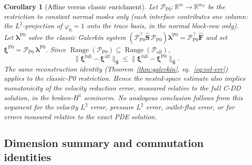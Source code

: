 \documentclass[11pt,a4paper]{article}
\newtheorem{corollary}[assumption]{Corollary}
\newcommand{\R}{\mathbb{R}}
\newcommand{\trac}{\bm{\lambda}}
\newcommand{\Schur}{\mathbf{S}}
\newcommand{\Range}{\operatorname{Range}}
\begin{document}
\begin{corollary}[Affine versus classic enrichment]\label{cor:enrich}
  Let $\mathcal{P}_{\text{P0}} : \R^m \to \R^{m_\Gamma}$ be the restriction
  to constant normal modes only (each interface contributes one column:
  the $L^2$-projection of $\varphi_0=1$ onto the trace basis, in the
  normal block-row only).
  Let $\trac^{\text{P0}}$ solve the classic Galerkin system
  $(\mathcal{P}_{\text{P0}}^\top \widehat{\Schur}\,\mathcal{P}_{\text{P0}})
   \trac^{\text{P0}} = \mathcal{P}_{\text{P0}}^\top \widehat{\bm{F}}$
  and set $\bm{\xi}^{\text{P0}} = \mathcal{P}_{\text{P0}}\,
  \trac^{\text{P0}}$.
  Since
  $\Range(\mathcal{P}_{\text{P0}}) \subseteq \Range(\mathcal{P}_{\text{aff}})$,
  \begin{equation}\label{eq:enrich}
    \|\bm{\xi}^{\text{full}} - \bm{\xi}^{\text{aff}}\|_{\widehat{\Schur}}
    \le \|\bm{\xi}^{\text{full}}
      - \bm{\xi}^{\text{P0}}\|_{\widehat{\Schur}}.
  \end{equation}
  The same reconstruction identity (Theorem~\ref{thm:galerkin},
  eq.~\eqref{eq:vel-err}) applies to the classic-P0 restriction.
  Hence the nested-space estimate also implies monotonicity of the
  velocity reduction error, measured relative to the full C-DD
  solution, in the broken-$H^1$ seminorm.  No analogous conclusion
  follows from this argument for the velocity $L^2$ error, pressure
  $L^2$ error, outlet-flux error, or for errors measured relative
  to the exact PDE solution.
\end{corollary}

\subsection{Dimension summary and commutation identities}
\end{document}
